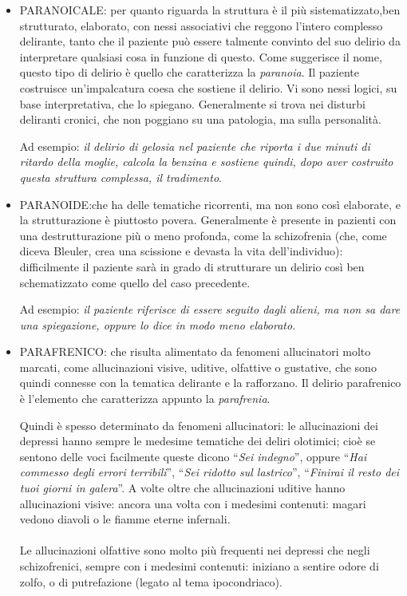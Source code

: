 \begin{itemize}
\item
  PARANOICALE: per quanto riguarda la struttura è il più
  sistematizzato,ben strutturato, elaborato, con nessi associativi che
  reggono l'intero complesso delirante, tanto che il paziente può essere
  talmente convinto del suo delirio da interpretare qualsiasi cosa in
  funzione di questo. Come suggerisce il nome, questo tipo di delirio è
  quello che caratterizza la \emph{paranoia}. Il paziente costruisce
  un'impalcatura coesa che sostiene il delirio. Vi sono nessi logici, su
  base interpretativa, che lo spiegano. Generalmente si trova nei
  disturbi deliranti cronici, che non poggiano su una patologia, ma
  sulla personalità.

Ad esempio: \emph{il delirio di gelosia nel paziente che riporta i due
minuti di ritardo della moglie, calcola la benzina e sostiene quindi,
dopo aver costruito questa struttura complessa, il tradimento}.

\item
  PARANOIDE:che ha delle tematiche ricorrenti, ma non sono così
  elaborate, e la strutturazione è piuttosto povera. Generalmente è
  presente in pazienti con una destrutturazione più o meno profonda,
  come la schizofrenia (che, come diceva Bleuler, crea una scissione e
  devasta la vita dell'individuo): difficilmente il paziente sarà in
  grado di strutturare un delirio così ben schematizzato come quello del
  caso precedente.

Ad esempio: \emph{il paziente riferisce di essere seguito dagli alieni,
ma non sa dare una spiegazione, oppure lo dice in modo meno elaborato}.

\item
  PARAFRENICO: che risulta alimentato da fenomeni allucinatori molto
  marcati, come allucinazioni visive, uditive, olfattive o gustative,
  che sono quindi connesse con la tematica delirante e la rafforzano. Il
  delirio parafrenico è l'elemento che caratterizza appunto la
  \emph{parafrenia}.

  Quindi è spesso determinato da fenomeni allucinatori: le allucinazioni
  dei depressi hanno sempre le medesime tematiche dei deliri olotimici;
  cioè se sentono delle voci facilmente queste dicono ``\emph{Sei
  indegno}'', oppure ``\emph{Hai commesso degli errori terribili}'',
  ``\emph{Sei ridotto sul lastrico}'', ``\emph{Finirai il resto dei tuoi
  giorni in galera}''. A volte oltre che allucinazioni uditive hanno
  allucinazioni visive: ancora una volta con i medesimi contenuti:
  magari vedono diavoli o le fiamme eterne infernali.
\\\\
Le allucinazioni olfattive sono molto più frequenti nei depressi che
negli schizofrenici, sempre con i medesimi contenuti: iniziano a sentire
odore di zolfo, o di putrefazione (legato al tema ipocondriaco).
\end{itemize}

